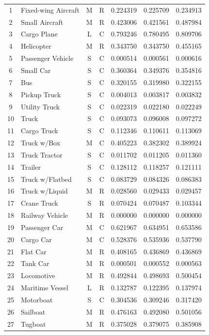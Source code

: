 \begin{center}
\begin{longtable}{|c|l|c|c|c|c|c|}
1 & Fixed-wing Aircraft & M & R & 0.224319 & 0.225709 & 0.234913\\
2 & Small Aircraft & M & R & 0.423006 & 0.421561 & 0.487984\\
3 & Cargo Plane & L & C & 0.793246 & 0.780495 & 0.809706\\
4 & Helicopter & M & R & 0.343750 & 0.343750 & 0.455165\\
5 & Passenger Vehicle & S & C & 0.000514 & 0.000561 & 0.000616\\
6 & Small Car & S & C & 0.360364 & 0.349376 & 0.354816\\
7 & Bus & S & C & 0.320155 & 0.319980 & 0.322155\\
8 & Pickup Truck & S & C & 0.004013 & 0.003817 & 0.003832\\
9 & Utility Truck & S & C & 0.022319 & 0.022180 & 0.022249\\
10 & Truck & S & C & 0.093073 & 0.096008 & 0.097272\\
11 & Cargo Truck & S & C & 0.112346 & 0.110611 & 0.113069\\
12 & Truck w/Box & M & C & 0.405223 & 0.382302 & 0.389924\\
13 & Truck Tractor & S & C & 0.011702 & 0.011205 & 0.011360\\
14 & Trailer & S & C & 0.128112 & 0.118257 & 0.121111\\
15 & Truck w/Flatbed & S & C & 0.083729 & 0.084326 & 0.086383\\
16 & Truck w/Liquid & M & R & 0.028560 & 0.029433 & 0.029457\\
17 & Crane Truck & S & R & 0.070424 & 0.070487 & 0.103344\\
18 & Railway Vehicle & M & R & 0.000000 & 0.000000 & 0.000000\\
19 & Passenger Car & M & C & 0.621967 & 0.634951 & 0.653586\\
20 & Cargo Car & M & C & 0.528376 & 0.535936 & 0.537790\\
21 & Flat Car & M & R & 0.408165 & 0.436869 & 0.436869\\
22 & Tank Car & M & R & 0.000501 & 0.000552 & 0.000563\\
23 & Locomotive & M & R & 0.492844 & 0.498693 & 0.500454\\
24 & Maritime Vessel & L & R & 0.132787 & 0.122395 & 0.137974\\
25 & Motorboat & S & C & 0.304536 & 0.309246 & 0.317420\\
26 & Sailboat & M & R & 0.476163 & 0.492080 & 0.501056\\
27 & Tugboat & M & R & 0.375028 & 0.379075 & 0.385908\\

\end{longtable}
\end{center}
